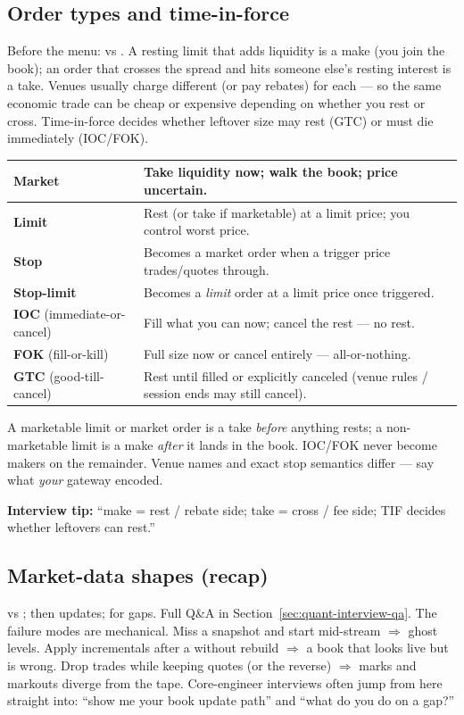\subsection{Order types and time-in-force}
\label{subsec:order-types}
Before the menu:  vs . A resting limit that adds 
liquidity is a make (you join the book); an order that crosses the spread and hits 
someone else's resting interest is a take. Venues usually charge different 
 (or pay rebates) for each --- so the same economic trade can be 
cheap or expensive depending on whether you rest or cross. Time-in-force decides 
whether leftover size may rest (GTC) or must die immediately (IOC/FOK).
\begin{center}
\small
\begin{tabularx}{\textwidth}{|l|X|}
\hline
\textbf{Market} & Take liquidity now; walk the book; price uncertain. \\
\hline
\textbf{Limit} & Rest (or take if marketable) at a limit price; you control worst price. \\
\hline
\textbf{Stop} & Becomes a market order when a trigger price trades/quotes through. \\
\hline
\textbf{Stop-limit} & Becomes a \emph{limit} order at a limit price once triggered. \\
\hline
\textbf{IOC} (immediate-or-cancel) & Fill what you can now; cancel the rest --- no rest. \\
\hline
\textbf{FOK} (fill-or-kill) & Full size now or cancel entirely --- all-or-nothing. \\
\hline
\textbf{GTC} (good-till-cancel) & Rest until filled or explicitly canceled (venue rules / session ends may still cancel). \\
\hline
\end{tabularx}
\end{center}
A marketable limit or market order is a take \emph{before} anything rests; a 
non-marketable limit is a make \emph{after} it lands in the book. IOC/FOK never become 
makers on the remainder. Venue names and exact stop semantics differ --- say what 
\emph{your} gateway encoded.
\par\noindent\textbf{Interview tip:} ``make = rest / rebate side; take = cross / fee side; 
TIF decides whether leftovers can rest.''

\subsection{Market-data shapes (recap)}
\label{subsec:md-shapes-recap}
 vs ;  then 
 updates;  for gaps. Full Q\&A 
in Section~\ref{sec:quant-interview-qa}.
\newline
The failure modes are mechanical. Miss a snapshot and start mid-stream $\Rightarrow$ 
ghost levels. Apply incrementals after a  without rebuild 
$\Rightarrow$ a book that looks live but is wrong. Drop trades while keeping quotes 
(or the reverse) $\Rightarrow$ marks and markouts diverge from the tape. Core-engineer 
interviews often jump from here straight into: ``show me your book update path'' and 
``what do you do on a gap?''

